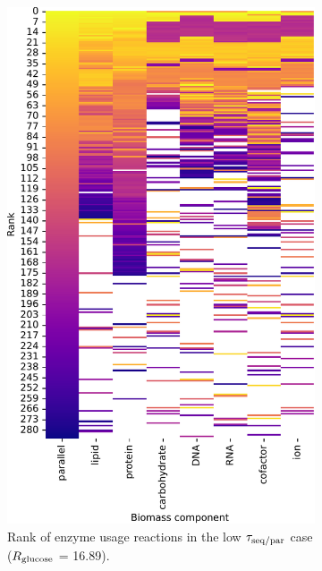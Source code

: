 \begin{figure}
  \centering
  \begin{subfigure}[t]{0.45\textwidth}
  \centering
    \includegraphics[width=\linewidth]{CompareEnzUse_glc16p89_pyrUnres_ammUnres_1.pdf}
    \caption{
      Rank of enzyme usage reactions in the low $\tau_{\mathrm{seq}/\mathrm{par}}$ case ($R_{\mathrm{glucose}}$ = \SI{16.89}{\mmolgdwh}).
    }
    \label{fig:model-rank-glc-lowratio-rank}
  \end{subfigure}%
  \begin{subfigure}[t]{0.45\textwidth}
  \centering

\end{subfigure}
\end{figure}
